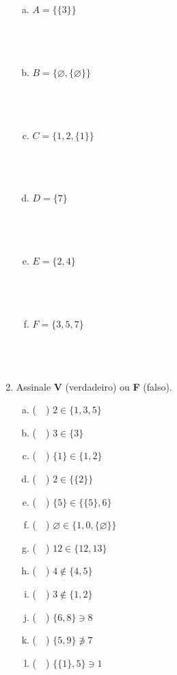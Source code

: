 \documentclass[a4paper,14pt]{article}
\begin{document}
\begin{multicols}{2}
\begin{enumerate}
			\begin{enumerate}[a)]
				\item $A = \{\{3\}\}$ \\\\\\\\
				\item $B = \{\varnothing, \{\varnothing\}\}$ \\\\\\\\
				\item $C = \{1, 2, \{1\}\}$ \\\\\\\\
				\item $D = \{7\}$ \\\\\\\\
				\item $E = \{2, 4\}$ \\\\\\\\
				\item $F = \{3, 5, 7\}$ \\\\\\\\
			\end{enumerate}	
			\item Assinale \textbf{V} (verdadeiro) ou \textbf{F} (falso).
			\begin{enumerate}[a)]
				\item (~~) $2 \in \{1, 3, 5\}$
				\item (~~) $3 \in \{3\}$
				\item (~~) $\{1\} \in \{1, 2\}$
				\item (~~) $2 \in \{\{2\}\}$
				\item (~~) $\{5\} \in \{\{5\}, 6\}$
				\item (~~) $\varnothing \in \{1, 0, \{ \varnothing \}\}$
				\item (~~) $12 \in \{12, 13\}$
				\item (~~) $4 \notin \{4, 5\}$
				\item (~~) $3 \notin \{1, 2\}$
				\item (~~) $\{6, 8\} \ni 8$
				\item (~~) $\{5, 9\} \not\ni 7$
				\item (~~) $\{\{1\}, 5\} \ni 1$

\end{enumerate}
\end{enumerate}
\end{multicols}
\end{document}

